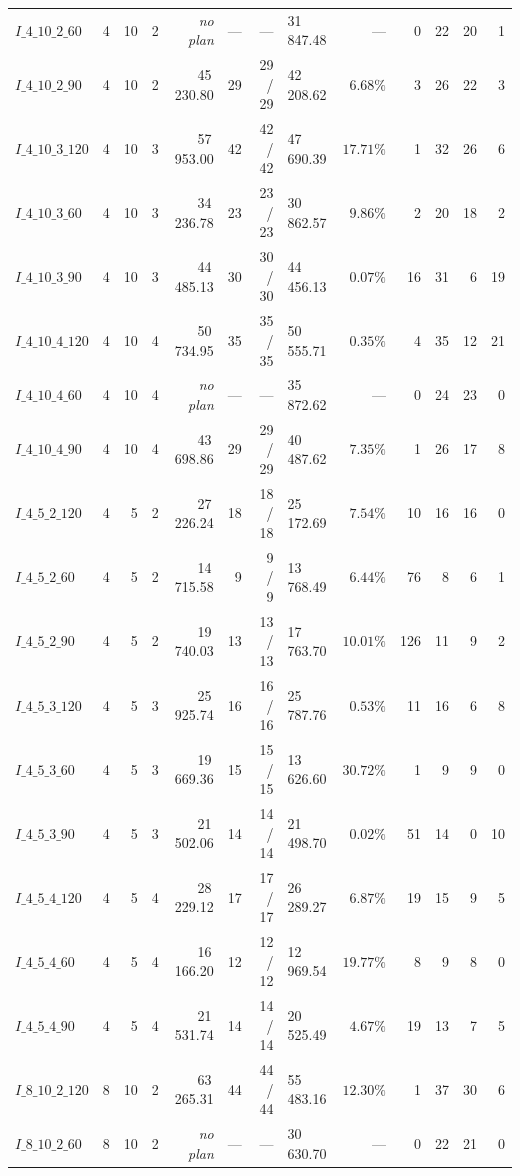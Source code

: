 \begin{table}[!htbp]
{\begin{tabular}{lrrrrrrlrrrrr}
$I\_4\_10\_2\_60$ & 4 & 10 & 2 & \emph{no plan} & --- & --- & 31\,847.48 & --- & 0 & 22 & 20 & 1 \\
$I\_4\_10\_2\_90$ & 4 & 10 & 2 & 45\,230.80 & 29 & 29 / 29 & 42\,208.62 & $6.68\%$ & 3 & 26 & 22 & 3 \\
$I\_4\_10\_3\_120$ & 4 & 10 & 3 & 57\,953.00 & 42 & 42 / 42 & 47\,690.39 & $17.71\%$ & 1 & 32 & 26 & 6 \\
$I\_4\_10\_3\_60$ & 4 & 10 & 3 & 34\,236.78 & 23 & 23 / 23 & 30\,862.57 & $9.86\%$ & 2 & 20 & 18 & 2 \\
$I\_4\_10\_3\_90$ & 4 & 10 & 3 & 44\,485.13 & 30 & 30 / 30 & 44\,456.13 & $0.07\%$ & 16 & 31 & 6 & 19 \\
$I\_4\_10\_4\_120$ & 4 & 10 & 4 & 50\,734.95 & 35 & 35 / 35 & 50\,555.71 & $0.35\%$ & 4 & 35 & 12 & 21 \\
$I\_4\_10\_4\_60$ & 4 & 10 & 4 & \emph{no plan} & --- & --- & 35\,872.62 & --- & 0 & 24 & 23 & 0 \\
$I\_4\_10\_4\_90$ & 4 & 10 & 4 & 43\,698.86 & 29 & 29 / 29 & 40\,487.62 & $7.35\%$ & 1 & 26 & 17 & 8 \\
$I\_4\_5\_2\_120$ & 4 & 5 & 2 & 27\,226.24 & 18 & 18 / 18 & 25\,172.69 & $7.54\%$ & 10 & 16 & 16 & 0 \\
$I\_4\_5\_2\_60$ & 4 & 5 & 2 & 14\,715.58 & 9 & 9 / 9 & 13\,768.49 & $6.44\%$ & 76 & 8 & 6 & 1 \\
$I\_4\_5\_2\_90$ & 4 & 5 & 2 & 19\,740.03 & 13 & 13 / 13 & 17\,763.70 & $10.01\%$ & 126 & 11 & 9 & 2 \\
$I\_4\_5\_3\_120$ & 4 & 5 & 3 & 25\,925.74 & 16 & 16 / 16 & 25\,787.76 & $0.53\%$ & 11 & 16 & 6 & 8 \\
$I\_4\_5\_3\_60$ & 4 & 5 & 3 & 19\,669.36 & 15 & 15 / 15 & 13\,626.60 & $30.72\%$ & 1 & 9 & 9 & 0 \\
$I\_4\_5\_3\_90$ & 4 & 5 & 3 & 21\,502.06 & 14 & 14 / 14 & 21\,498.70 & $0.02\%$ & 51 & 14 & 0 & 10 \\
$I\_4\_5\_4\_120$ & 4 & 5 & 4 & 28\,229.12 & 17 & 17 / 17 & 26\,289.27 & $6.87\%$ & 19 & 15 & 9 & 5 \\
$I\_4\_5\_4\_60$ & 4 & 5 & 4 & 16\,166.20 & 12 & 12 / 12 & 12\,969.54 & $19.77\%$ & 8 & 9 & 8 & 0 \\
$I\_4\_5\_4\_90$ & 4 & 5 & 4 & 21\,531.74 & 14 & 14 / 14 & 20\,525.49 & $4.67\%$ & 19 & 13 & 7 & 5 \\
$I\_8\_10\_2\_120$ & 8 & 10 & 2 & 63\,265.31 & 44 & 44 / 44 & 55\,483.16 & $12.30\%$ & 1 & 37 & 30 & 6 \\
$I\_8\_10\_2\_60$ & 8 & 10 & 2 & \emph{no plan} & --- & --- & 30\,630.70 & --- & 0 & 22 & 21 & 0 \\

\end{tabular}}
\end{table}
